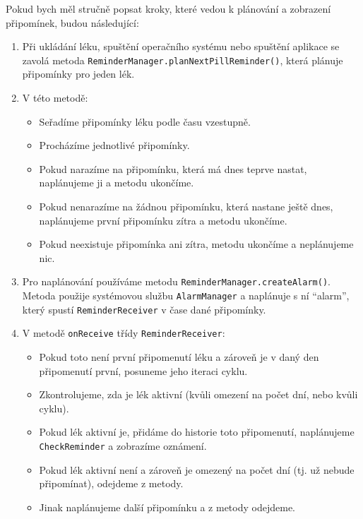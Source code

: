 \documentclass[../TakeYourPill.tex]{subfiles}
\begin{document}
Pokud bych měl stručně popsat kroky, které vedou k plánování a zobrazení připomínek, budou následující:

\begin{enumerate}
  \item Při ukládání léku, spuštění operačního systému nebo spuštění aplikace se zavolá metoda \texttt{ReminderManager.planNextPillReminder()}, která plánuje připomínky pro jeden lék.
  \item V této metodě:
  \begin{itemize}
    \item Seřadíme připomínky léku podle času vzestupně.
    \item Procházíme jednotlivé připomínky.
    \item Pokud narazíme na připomínku, která má dnes teprve nastat, naplánujeme ji a metodu ukončíme.
    \item Pokud nenarazíme na žádnou připomínku, která nastane ještě dnes, naplánujeme první připomínku zítra a metodu ukončíme.
    \item Pokud neexistuje připomínka ani zítra, metodu ukončíme a neplánujeme nic.
  \end{itemize}
  \item Pro naplánování používáme metodu \texttt{ReminderManager.createAlarm()}. Metoda použije systémovou službu \texttt{AlarmManager} a naplánuje s ní \enquote{alarm}, který spustí \texttt{ReminderReceiver} v čase dané připomínky.
  \item V metodě \texttt{onReceive} třídy \texttt{ReminderReceiver}:
  \begin{itemize}
    \item Pokud toto není první připomenutí léku a zároveň je v daný den připomenutí první, posuneme jeho iteraci cyklu.
    \item Zkontrolujeme, zda je lék aktivní (kvůli omezení na počet dní, nebo kvůli cyklu).
    \item Pokud lék aktivní je, přidáme do historie toto připomenutí, naplánujeme \texttt{CheckReminder} a zobrazíme oznámení.
    \item Pokud lék aktivní není a zároveň je omezený na počet dní (tj. už nebude připomínat), odejdeme z metody.
    \item Jinak naplánujeme další připomínku a z metody odejdeme.
  \end{itemize}
\end{enumerate}
\end{document}

